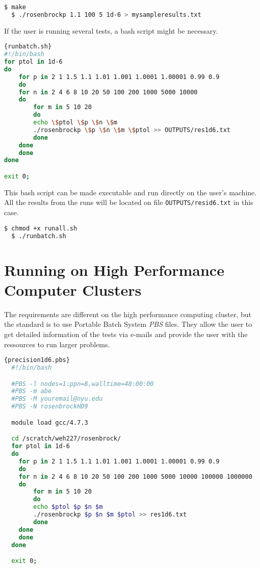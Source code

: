 \begin{lstlisting}[language=bash]
  $ make
  $ ./rosenbrockp 1.1 100 5 1d-6 > mysampleresults.txt
\end{lstlisting}

If the user is running several tests, a bash script might be necessary.

\begin{lstlisting}[language=bash]{runbatch.sh}
#!/bin/bash
for ptol in 1d-6
do
    for p in 2 1 1.5 1.1 1.01 1.001 1.0001 1.00001 0.99 0.9
    do
	for n in 2 4 6 8 10 20 50 100 200 1000 5000 10000
	do
	    for m in 5 10 20
	    do
		echo \$ptol \$p \$n \$m
		./rosenbrockp \$p \$n \$m \$ptol >> OUTPUTS/res1d6.txt
	    done
	done
    done
done

exit 0;
\end{lstlisting}

This bash script can be made executable and run directly on the user's machine. All the results from the runs will be located on file \texttt{OUTPUTS/resid6.txt} in this case.

\begin{lstlisting}[language=bash]
  $ chmod +x runall.sh
  $ ./runbatch.sh
\end{lstlisting}

\section{Running on High Performance Computer Clusters}

The requirements are different on the high performance computing cluster, but the standard is to use Portable Batch System \emph{PBS} files. They allow the user to get detailed information of the tests via e-mails and provide the user with the ressources to run larger problems.

\begin{lstlisting}[language=bash]{precision1d6.pbs}
  #!/bin/bash

  #PBS -l nodes=1:ppn=8,walltime=48:00:00
  #PBS -m abe
  #PBS -M youremail@nyu.edu
  #PBS -N rosenbrockHD9

  module load gcc/4.7.3

  cd /scratch/weh227/rosenbrock/
  for ptol in 1d-6
  do
    for p in 2 1 1.5 1.1 1.01 1.001 1.0001 1.00001 0.99 0.9
    do
	for n in 2 4 6 8 10 20 50 100 200 1000 5000 10000 100000 1000000
	do
	    for m in 5 10 20
	    do
		echo $ptol $p $n $m
		./rosenbrockp $p $n $m $ptol >> res1d6.txt
	    done
	done
    done
  done

  exit 0;
\end{lstlisting}

